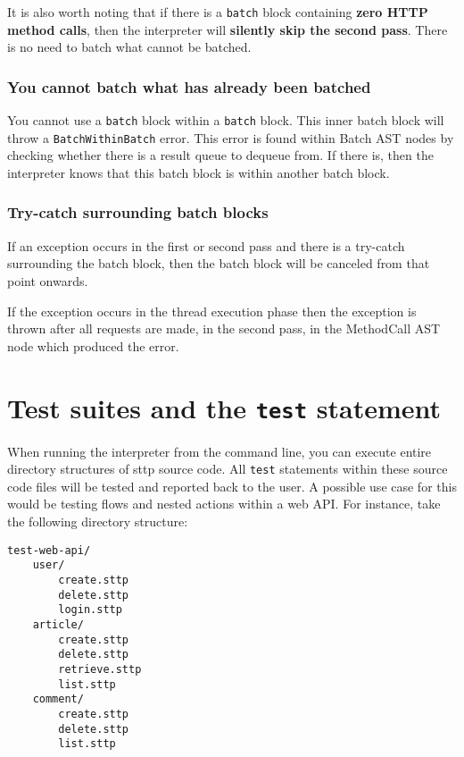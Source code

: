 It is also worth noting that if there is a \verb|batch| block containing \textbf{zero HTTP method calls}, then the interpreter will \textbf{silently skip the second pass}. There is no need to batch what cannot be batched.

\subsubsection{You cannot batch what has already been batched}

You cannot use a \verb|batch| block within a \verb|batch| block. This inner batch block will throw a \verb|BatchWithinBatch| error. This error is found within Batch AST nodes by checking whether there is a result queue to dequeue from. If there is, then the interpreter knows that this batch block is within another batch block.

\subsubsection{Try-catch surrounding batch blocks}

If an exception occurs in the first or second pass and there is a try-catch surrounding the batch block, then the batch block will be canceled from that point onwards.

If the exception occurs in the thread execution phase then the exception is thrown after all requests are made, in the second pass, in the MethodCall AST node which produced the error.

\cprotect\section{Test suites and the \verb|test| statement}

When running the interpreter from the command line, you can execute entire directory structures of sttp source code. All \verb|test| statements within these source code files will be tested and reported back to the user. A possible use case for this would be testing flows and nested actions within a web API. For instance, take the following directory structure:

\begin{verbatim}
test-web-api/
    user/
        create.sttp
        delete.sttp
        login.sttp
    article/
        create.sttp
        delete.sttp
        retrieve.sttp
        list.sttp
    comment/
        create.sttp
        delete.sttp
        list.sttp
\end{verbatim}

